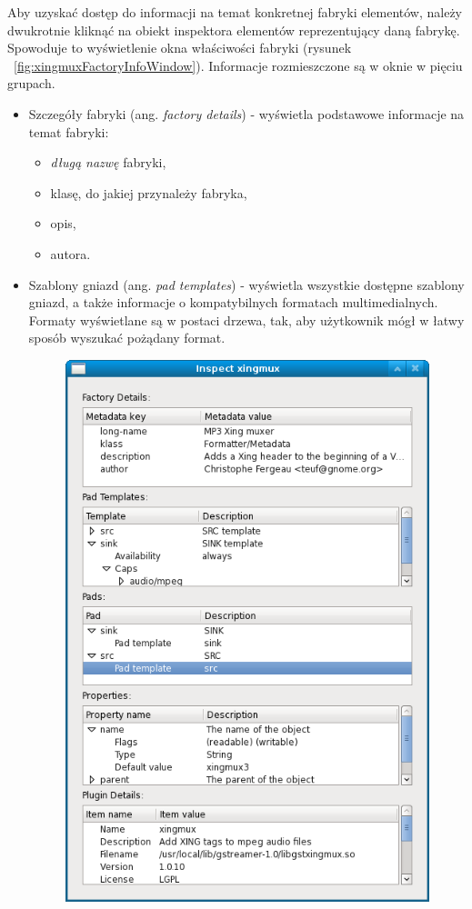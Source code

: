 \documentclass[12pt]{article}
\begin{document}
\noindent
Aby uzyskać dostęp do informacji na temat konkretnej fabryki elementów, należy dwukrotnie kliknąć na obiekt inspektora elementów reprezentujący daną fabrykę. Spowoduje to wyświetlenie okna właściwości fabryki (rysunek ~\ref{fig:xingmuxFactoryInfoWindow}). Informacje rozmieszczone są w oknie w pięciu grupach.
\begin{itemize}
  \setlength{\itemsep}{0em}
\item Szczegóły fabryki (ang. \textit{factory details}) - wyświetla podstawowe informacje na temat fabryki:
  \begin{itemize}
    \setlength{\itemsep}{0em}
  \item \textit{długą nazwę} fabryki,
  \item klasę, do jakiej przynależy fabryka,
  \item opis,
  \item autora.
  \end{itemize}
\item Szablony gniazd (ang. \textit{pad templates}) - wyświetla wszystkie dostępne szablony gniazd, a także informacje o kompatybilnych formatach multimedialnych. Formaty wyświetlane są w postaci drzewa, tak, aby użytkownik mógł w łatwy sposób wyszukać pożądany format.
\begin{figure}[H]
  \includegraphics[width=110mm]{img/xingmux-factory-info-window.png}

\end{figure}
\end{itemize}
\end{document}
